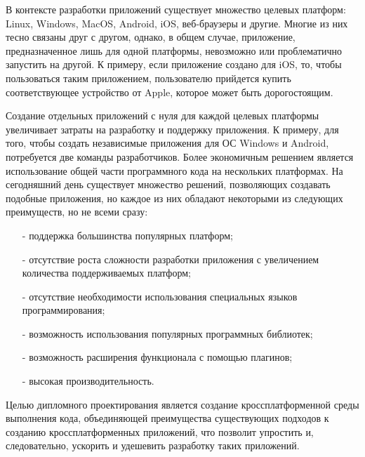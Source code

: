 В контексте разработки приложений существует множество целевых платформ: Linux, Windows, MacOS, Android, iOS, веб-браузеры и другие.
Многие из них тесно связаны друг с другом, однако, в общем случае, приложение, предназначенное лишь для одной платформы, невозможно или проблематично запустить на другой.
К примеру, если приложение создано для iOS, то, чтобы пользоваться таким приложением, пользователю прийдется купить соответствующее устройство от Apple, которое может быть дорогостоящим.

Создание отдельных приложений с нуля для каждой целевых платформы увеличивает затраты на разработку и поддержку приложения. 
К примеру, для того, чтобы создать независимые приложения для ОС Windows и Android, потребуется две команды разработчиков.
Более экономичным решением является использование общей части программного кода на нескольких платформах.
На сегодняшний день существует множество решений, позволяющих создавать подобные приложения, но каждое из них обладают некоторыми из следующих преимуществ, но не всеми сразу:
\begin{itemize}
    \item[-] поддержка большинства популярных платформ;
    \item[-] отсутствие роста сложности разработки приложения с увеличением количества поддерживаемых платформ;
    \item[-] отсутствие необходимости использования специальных языков программирования;
    \item[-] возможность использования популярных программных библиотек;
    \item[-] возможность расширения функционала с помощью плагинов;
    \item[-] высокая производительность.
\end{itemize}

Целью дипломного проектирования является создание кроссплатформенной среды выполнения кода, объединяющей преимущества существующих подходов к созданию кроссплатформенных приложений, что позволит упростить и, следовательно, ускорить и удешевить разработку таких приложений.
